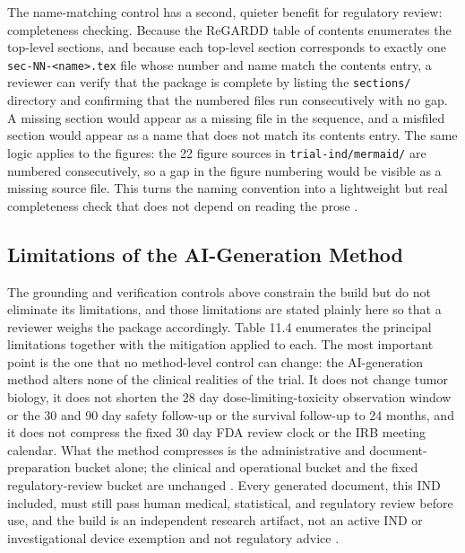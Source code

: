 The name-matching control has a second, quieter benefit for regulatory review:
completeness checking. Because the ReGARDD table of contents enumerates the
top-level sections, and because each top-level section corresponds to exactly one
\texttt{sec-NN-<name>.tex} file whose number and name match the contents entry, a
reviewer can verify that the package is complete by listing the
\texttt{sections/} directory and confirming that the numbered files run
consecutively with no gap. A missing section would appear as a missing file in the
sequence, and a misfiled section would appear as a name that does not match its
contents entry. The same logic applies to the figures: the 22 figure sources in
\texttt{trial-ind/mermaid/} are numbered consecutively, so a gap in the figure
numbering would be visible as a missing source file. This turns the naming
convention into a lightweight but real completeness check that does not depend on
reading the prose \cite{paisitedocpk, natlpaiplatf}.

\subsection{Limitations of the AI-Generation Method}

The grounding and verification controls above constrain the build but do not
eliminate its limitations, and those limitations are stated plainly here so that a
reviewer weighs the package accordingly. Table 11.4 enumerates the principal
limitations together with the mitigation applied to each. The most important point
is the one that no method-level control can change: the AI-generation method alters
none of the clinical realities of the trial. It does not change tumor biology, it
does not shorten the 28 day dose-limiting-toxicity observation window or the 30 and
90 day safety follow-up or the survival follow-up to 24 months, and it does not
compress the fixed 30 day FDA review clock or the IRB meeting calendar. What the
method compresses is the administrative and document-preparation bucket alone; the
clinical and operational bucket and the fixed regulatory-review bucket are
unchanged \cite{phase1guidance, pdac060s2030}. Every generated document, this IND
included, must still pass human medical, statistical, and regulatory review before
use, and the build is an independent research artifact, not an active IND or
investigational device exemption and not regulatory advice
\cite{cfr312paiuni, cfr050paiuni}.

